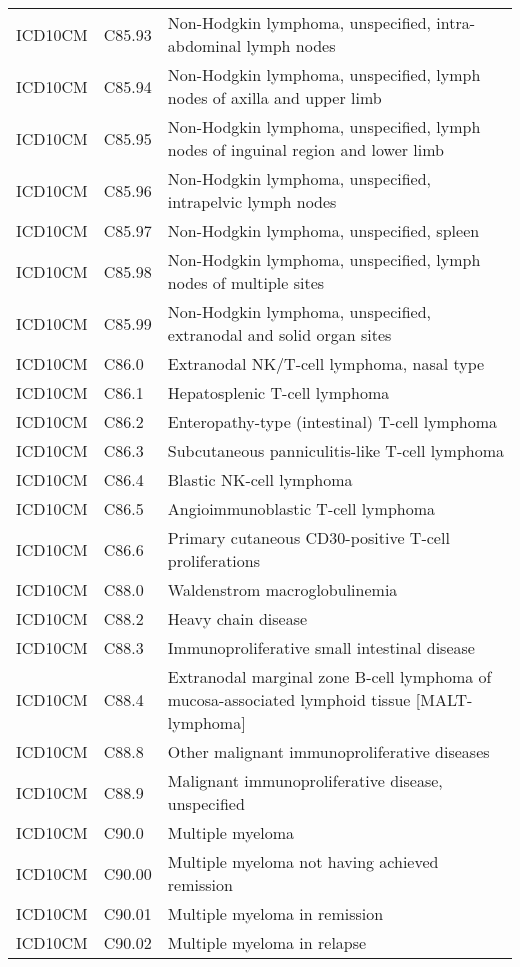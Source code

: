 \begin{table}[ht]
\begin{tabular}{lll}
  ICD10CM & C85.93 & Non-Hodgkin lymphoma, unspecified, intra-abdominal lymph nodes \\ 
  ICD10CM & C85.94 & Non-Hodgkin lymphoma, unspecified, lymph nodes of axilla and upper limb \\ 
  ICD10CM & C85.95 & Non-Hodgkin lymphoma, unspecified, lymph nodes of inguinal region and lower limb \\ 
  ICD10CM & C85.96 & Non-Hodgkin lymphoma, unspecified, intrapelvic lymph nodes \\ 
  ICD10CM & C85.97 & Non-Hodgkin lymphoma, unspecified, spleen \\ 
  ICD10CM & C85.98 & Non-Hodgkin lymphoma, unspecified, lymph nodes of multiple sites \\ 
  ICD10CM & C85.99 & Non-Hodgkin lymphoma, unspecified, extranodal and solid organ sites \\ 
  ICD10CM & C86.0 & Extranodal NK/T-cell lymphoma, nasal type \\ 
  ICD10CM & C86.1 & Hepatosplenic T-cell lymphoma \\ 
  ICD10CM & C86.2 & Enteropathy-type (intestinal) T-cell lymphoma \\ 
  ICD10CM & C86.3 & Subcutaneous panniculitis-like T-cell lymphoma \\ 
  ICD10CM & C86.4 & Blastic NK-cell lymphoma \\ 
  ICD10CM & C86.5 & Angioimmunoblastic T-cell lymphoma \\ 
  ICD10CM & C86.6 & Primary cutaneous CD30-positive T-cell proliferations \\ 
  ICD10CM & C88.0 & Waldenstrom macroglobulinemia \\ 
  ICD10CM & C88.2 & Heavy chain disease \\ 
  ICD10CM & C88.3 & Immunoproliferative small intestinal disease \\ 
  ICD10CM & C88.4 & Extranodal marginal zone B-cell lymphoma of mucosa-associated lymphoid tissue [MALT-lymphoma] \\ 
  ICD10CM & C88.8 & Other malignant immunoproliferative diseases \\ 
  ICD10CM & C88.9 & Malignant immunoproliferative disease, unspecified \\ 
  ICD10CM & C90.0 & Multiple myeloma \\ 
  ICD10CM & C90.00 & Multiple myeloma not having achieved remission \\ 
  ICD10CM & C90.01 & Multiple myeloma in remission \\ 
  ICD10CM & C90.02 & Multiple myeloma in relapse \\ 

\end{tabular}
\end{table}
